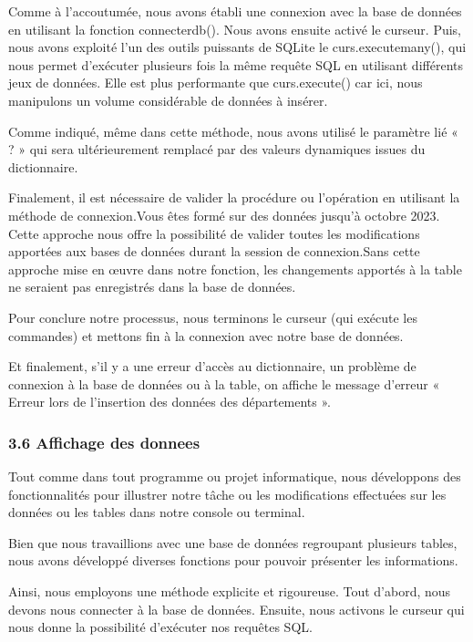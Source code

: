 \documentclass[
]{article}
\begin{document}
Comme à l'accoutumée, nous avons établi une connexion avec la base de
données en utilisant la fonction connecterdb(). Nous avons ensuite
activé le curseur. Puis, nous avons exploité l'un des outils puissants
de SQLite le curs.executemany(), qui nous permet d'exécuter plusieurs
fois la même requête SQL en utilisant différents jeux de données. Elle
est plus performante que curs.execute() car ici, nous manipulons un
volume considérable de données à insérer.

Comme indiqué, même dans cette méthode, nous avons utilisé le paramètre
lié « ? » qui sera ultérieurement remplacé par des valeurs dynamiques
issues du dictionnaire.

Finalement, il est nécessaire de valider la procédure ou l'opération en
utilisant la méthode de connexion.Vous êtes formé sur des données
jusqu'à octobre 2023. Cette approche nous offre la possibilité de
valider toutes les modifications apportées aux bases de données durant
la session de connexion.Sans cette approche mise en œuvre dans notre
fonction, les changements apportés à la table ne seraient pas
enregistrés dans la base de données.

Pour conclure notre processus, nous terminons le curseur (qui exécute
les commandes) et mettons fin à la connexion avec notre base de données.

Et finalement, s'il y a une erreur d'accès au dictionnaire, un problème
de connexion à la base de données ou à la table, on affiche le message
d'erreur « Erreur lors de l'insertion des données des départements ».

\subsubsection{3.6 Affichage des donnees}\label{affichage-des-donnees}

Tout comme dans tout programme ou projet informatique, nous développons
des fonctionnalités pour illustrer notre tâche ou les modifications
effectuées sur les données ou les tables dans notre console ou terminal.

Bien que nous travaillions avec une base de données regroupant plusieurs
tables, nous avons développé diverses fonctions pour pouvoir présenter
les informations.

Ainsi, nous employons une méthode explicite et rigoureuse. Tout d'abord,
nous devons nous connecter à la base de données. Ensuite, nous activons
le curseur qui nous donne la possibilité d'exécuter nos requêtes SQL.
\end{document}
